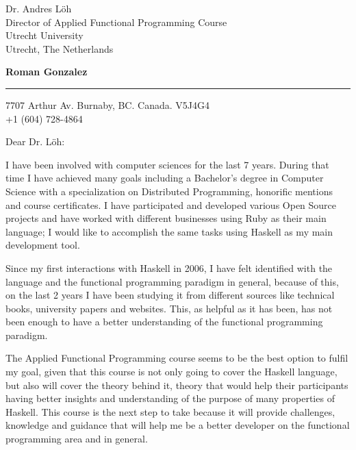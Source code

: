 \documentclass{letter} %
\begin{document}
\signature{Roman Gonzalez.}           %
\longindentation=0pt                  %
\let\raggedleft\raggedright           %
 
 
\begin{letter}{Dr. Andres L\"oh \\
Director of Applied Functional Programming Course \\
Utrecht University \\
Utrecht, The Netherlands}


\begin{flushleft}
{\large\bf Roman Gonzalez}
\end{flushleft}
\medskip\hrule height 1pt
\begin{flushright}
\hfill 7707 Arthur Av. Burnaby, BC. Canada. V5J4G4 \\
\hfill +1 (604) 728-4864
\end{flushright} 
\vfill %

 
\opening{Dear Dr. L\"oh:} 
 
\noindent I have been involved with computer sciences for the last 7 years. 
During that time I have achieved many goals including a Bachelor's degree in 
Computer Science with a specialization on Distributed Programming, honorific 
mentions and course certificates. I have participated and developed various Open 
Source projects and have worked with different businesses using Ruby as their 
main language; I would like to accomplish the same tasks using Haskell as my main
development tool. 

\noindent Since my first interactions with Haskell in 2006, I have felt identified with the 
language and the functional programming paradigm in general, because of this, on the last 2 years 
I have been studying it from different sources like technical books, university papers and websites. 
This, as helpful as it has been, has not been enough to have a better understanding of the functional 
programming paradigm. 

The Applied Functional Programming course seems to be the best option to fulfil my goal, given that this 
course is not only going to cover the Haskell language, but also will cover the theory behind it, theory that 
would help their participants having better insights and understanding of the purpose of many properties of Haskell. 
This course is the next step to take because it will provide challenges, knowledge and guidance that will help me 
be a better developer on the functional programming area and in general.


\end{letter}
\end{document}
